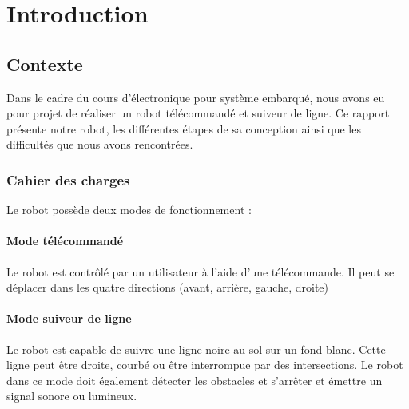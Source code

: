 \chapter{Introduction}

\section{Contexte}

Dans le cadre du cours d'électronique pour système embarqué,
nous avons eu pour projet de réaliser un robot télécommandé et suiveur de ligne.
Ce rapport présente notre robot, les différentes étapes de sa conception ainsi que les difficultés que nous avons rencontrées.


\subsection{Cahier des charges}

Le robot possède deux modes de fonctionnement :

\subsubsection{Mode télécommandé}

Le robot est contrôlé par un utilisateur à l'aide d'une télécommande.
Il peut se déplacer dans les quatre directions (avant, arrière, gauche, droite)

\subsubsection{Mode suiveur de ligne} \label{Mode suiveur de ligne}

Le robot est capable de suivre une ligne noire au sol sur un fond blanc.
Cette ligne peut être droite, courbé ou être interrompue par des intersections.
Le robot dans ce mode doit également détecter les obstacles et s'arrêter et émettre un signal sonore ou lumineux.